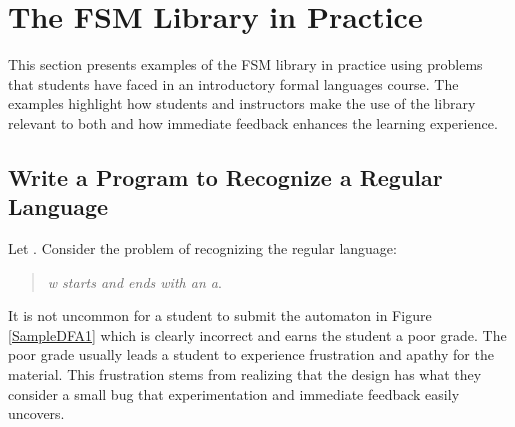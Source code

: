 \documentclass{eptcs}
\begin{document}
\section{The \textsf{FSM} Library in Practice}
This section presents examples of the \textsf{FSM} library in practice using problems that students have faced in an introductory formal languages course. The examples highlight how students and instructors make the use of the library relevant to both and how immediate feedback enhances the learning experience.

\subsection{Write a Program to Recognize a Regular Language}
\label{dfa}
Let . Consider the problem of recognizing the regular language:
\begin{quote}
 \emph{w starts and ends with an a}.
\end{quote}
It is not uncommon for a student to submit the automaton in Figure \ref{SampleDFA1} which is clearly incorrect and earns the student a poor grade. The poor grade usually leads a student to experience frustration and apathy for the material. This frustration stems from realizing that the design has what they consider a small bug that experimentation and immediate feedback easily uncovers.

\newcommand{\DFA}{
\begin{psmatrix}[rowsep=.5cm,colsep=.2cm,mnode=circle,fillstyle=solid,fillcolor=LightBlue]
             & & & & & & & & [name=N4] ds  \\
             & & & & [name=N1] q \\
             & & & & & & & & [name=N2] q  & & & & & &  [name=N3] q\\
             & & & &
\end{psmatrix}

\psset{arrows=->,linecolor=black,arcangle=30,arrowsize=4pt
2,labelsep=2pt}}

\newcommand{\DFAc}{
\begin{psmatrix}[rowsep=.5cm,colsep=.2cm,mnode=circle,fillstyle=solid,fillcolor=LightBlue]
             & & & & & & & & [name=N5] ds  \\
             & & & & [name=N6] q \\
             & & & & & & & & [name=N7] q  & & & & & &  [name=N8] q\\
             & & & &
\end{psmatrix}

\psset{arrows=->,linecolor=black,arcangle=30,arrowsize=4pt
2,labelsep=2pt}}
\end{document}
